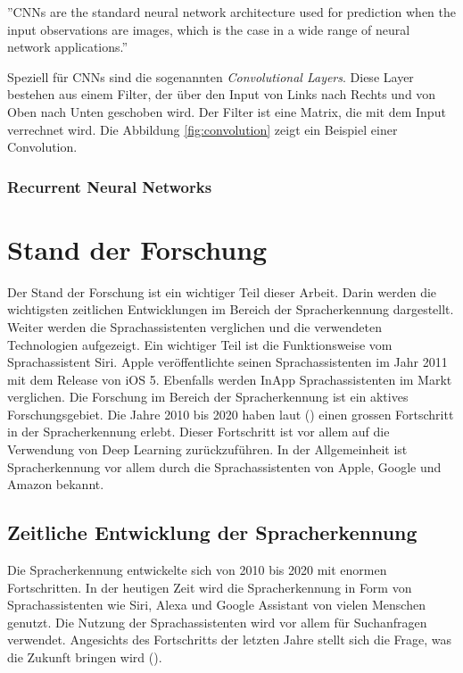 \documentclass[11pt,a4paper]{article}
\begin{document}
\begin{displayquote}
	''CNNs are the standard neural network architecture used for prediction when the input
	observations are images, which is the case in a wide range of neural network applications.''
\end{displayquote}

\noindent
Speziell für CNNs sind die sogenannten \textit{Convolutional Layers}. Diese Layer bestehen aus
einem Filter, der über den Input von Links nach Rechts und von Oben nach Unten geschoben wird.
Der Filter ist eine Matrix, die mit dem Input verrechnet wird. Die Abbildung \ref{fig:convolution}
zeigt ein Beispiel einer Convolution.




\subsubsection{Recurrent Neural Networks}


\newpage \section{Stand der Forschung}
Der Stand der Forschung ist ein wichtiger Teil dieser Arbeit. Darin werden die wichtigsten
zeitlichen Entwicklungen im Bereich der Spracherkennung dargestellt. Weiter werden die
Sprachassistenten verglichen und die verwendeten Technologien aufgezeigt. Ein wichtiger Teil ist
die Funktionsweise vom Sprachassistent Siri. Apple veröffentlichte seinen Sprachassistenten
im Jahr 2011 mit dem Release von iOS 5. Ebenfalls werden InApp Sprachassistenten im
Markt verglichen. Die Forschung im Bereich der Spracherkennung ist ein aktives Forschungsgebiet.
Die Jahre 2010 bis 2020 haben laut (\cite{hannun2021history}) einen grossen Fortschritt in der
Spracherkennung erlebt. Dieser Fortschritt ist vor allem auf die Verwendung von Deep Learning
zurückzuführen. In der Allgemeinheit ist Spracherkennung vor allem durch die Sprachassistenten von
Apple, Google und Amazon bekannt.


\subsection{Zeitliche Entwicklung der Spracherkennung}
Die Spracherkennung entwickelte sich von 2010 bis 2020 mit enormen Fortschritten. In der heutigen
Zeit wird die Spracherkennung in Form von Sprachassistenten wie Siri, Alexa und Google Assistant von
vielen Menschen genutzt. Die Nutzung der Sprachassistenten wird vor allem für Suchanfragen
verwendet. Angesichts des Fortschritts der letzten Jahre stellt sich die Frage, was die Zukunft
bringen wird (\cite{hannun2021history}).
\end{document}
